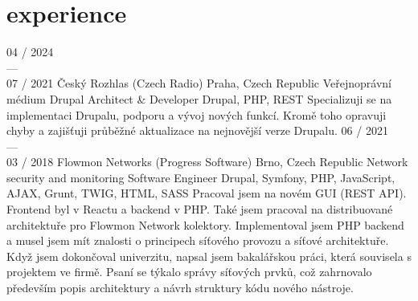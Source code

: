 \documentclass[]{friggeri-cv} %
\begin{document}
\bigskip

\section{experience}
\begin{entrylist}
  \job
  {04 / 2024 \\ --- \\ 07 / 2021}
  {Český Rozhlas (Czech Radio)}
  {Praha, Czech Republic}
  {Veřejnoprávní médium}
  {
    \position
      {Drupal Architect \& Developer}
      {Drupal, PHP, REST}
      {
          Specializuji se na implementaci Drupalu, podporu a vývoj nových funkcí. Kromě toho opravuji chyby a
          zajišťuji průběžné aktualizace na nejnovější verze Drupalu.
      }
  }
  \job
  {06 / 2021 \\ --- \\ 03 / 2018}
  {Flowmon Networks (Progress Software)}
  {Brno, Czech Republic}
  {Network security and monitoring}
  {
  \position
  {Software Engineer}
  {Drupal, Symfony, PHP, JavaScript, AJAX, Grunt, TWIG, HTML, SASS}
  {
      Pracoval jsem na novém GUI (REST API). Frontend byl v Reactu a backend v PHP.
      Také jsem pracoval na distribuované architektuře pro Flowmon Network kolektory.
      Implementoval jsem PHP backend a musel jsem mít znalosti o principech síťového provozu a síťové architektuře.
      Když jsem dokončoval univerzitu, napsal jsem bakalářskou práci, která souvisela s projektem ve firmě.
      Psaní se týkalo správy síťových prvků, což zahrnovalo především popis architektury a návrh struktury kódu
      nového nástroje.
  }%
  }
\end{entrylist}

\end{document}
